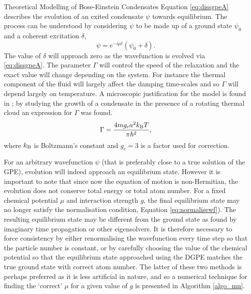 \begin{chapter}{\label{cha:theoretical_model}Theoretical Modelling of Bose-Einstein Condensates}
	Equation \ref{eq:dissgpeA} describes the evolution of an exited condensate $\psi$ towards equilibrium. The process can be understood by considering $\psi$ to be made up of a ground state $\psi_0$ and a coherent excitation $\delta$,
	\begin{equation*}\label{eq:dissantiherm2}
		\psi = e^{-i \mu t}(\psi_0 + \delta).
	\end{equation*}
	The value of $\delta$ will approach zero as the wavefunction is evolved via \ref{eq:dissgpeA}. The parameter $\Gamma$ will control the speed of the relaxation and the exact value will change depending on the system. For instance the thermal component of the fluid will largely affect the damping time-scales and so $\Gamma$ will depend largely on temperature. A microscopic justification for the model is found in \cite{penckwitt_2002, gardiner97}; by studying the growth of a condensate in the presence of a rotating thermal cloud an expression for $\Gamma$ was found.
		\begin{equation}\label{eq:dissgamma}
		\Gamma = \frac{4mg_ca^2k_{\rm B}T}{\pi\hbar^2},
		\end{equation}
	where $k_{\rm B}$ is Boltzmann's constant and $g_c = 3$ is a factor used for correction.

	For an arbitrary wavefunction $\psi$ (that is preferably close to a true solution of the GPE), evolution will indeed approach an equilibrium state. However it is important to note that since now the equation of motion is non-Hermitian, the evolution does not conserve total energy or total atom number. For a fixed chemical potential $\mu$ and interaction strength $g$, the final equilibrium state may no longer satisfy the normalisation condition, Equation \ref{eq:normalisewf}). The resulting equilibrium state may be different from the ground state as found by imaginary time propagation or other eigensolvers. It is therefore necessary to force consistency by either renormalising the wavefunction every time step so that the particle number is constant, or by carefully choosing the value of the chemical potential so that the equilibrium state approached using the DGPE matches the true ground state with correct atom number. The latter of these two methods is perhaps preferred as it is less artificial in nature, and so a numerical technique for finding the `correct' $\mu$ for a given value of $g$ is presented in Algorithm \ref{algo_mu}.


\end{chapter}
